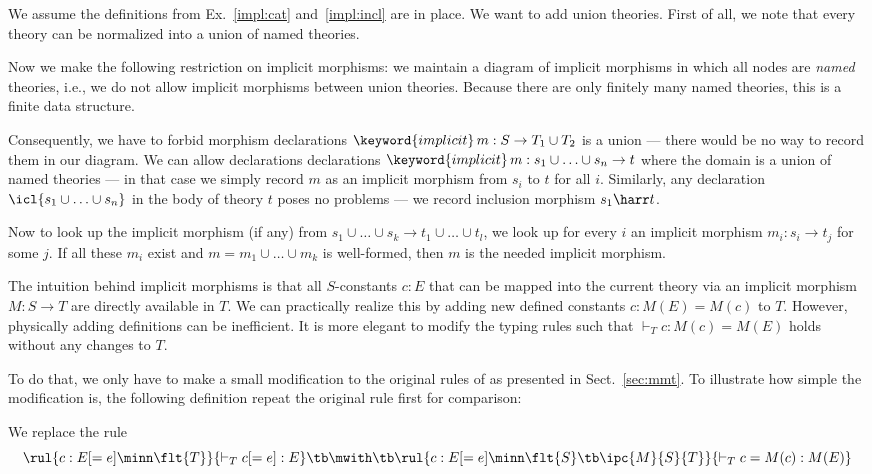\begin{example}\label{impl:union}
We assume the definitions from Ex.~\ref{impl:cat} and~\ref{impl:incl} are in place.
We want to add union theories.
First of all, we note that every theory can be normalized into a union of named theories.

Now we make the following restriction on implicit morphisms: we maintain a diagram of implicit morphisms in which all nodes are \emph{named} theories, i.e., we do not allow implicit morphisms between union theories.
Because there are only finitely many named theories, this is a finite data structure.

Consequently, we have to forbid morphism declarations $\keyword{implicit}\,m:S\to T_1\cup T_2$ is a union --- there would be no way to record them in our diagram.
We can allow declarations declarations $\keyword{implicit}\,m:s_1\cup\ldots\cup s_n\to t$ where the domain is a union of named theories --- in that case we simply record $m$ as an implicit morphism from $s_i$ to $t$ for all $i$.
Similarly, any declaration $\icl{s_1\cup\ldots\cup s_n}$ in the body of theory $t$ poses no problems --- we record inclusion morphism $s_1\harr t$.

Now to look up the implicit morphism (if any) from $s_1\cup\ldots\cup s_k\to t_1\cup\ldots\cup t_l$, we look up for every $i$ an implicit morphism $m_i:s_i\to t_j$ for some $j$.
If all these $m_i$ exist and $m=m_1\cup \ldots\cup m_k$ is well-formed, then $m$ is the needed implicit morphism.
\end{example}

The intuition behind implicit morphisms is that all $S$-constants $c:E$ that can be mapped into the current theory via an implicit morphism $M:S\to T$ are directly available in $T$.
We can practically realize this by adding new defined constants $c:M(E)=M(c)$ to $T$.
However, physically adding definitions can be inefficient.
It is more elegant to modify the typing rules such that $\vdash_T c:M(c)=M(E)$ holds without any changes to $T$.

To do that, we only have to make a small modification to the original rules of \mmt as presented in Sect.~\ref{sec:mmt}.
To illustrate how simple the modification is, the following definition repeat the original rule first for comparison:

\begin{definition}\label{def:useimpl}
We replace the rule
\[\rul{c:E[=e] \minn \flt{T}}{\vdash_T c[=e]:E} \tb \mwith\tb \rul{c:E[=e] \minn \flt{S}\tb \ipc{M}{S}{T}}{\vdash_T c=M(c):M(E)}\]
\end{definition}

